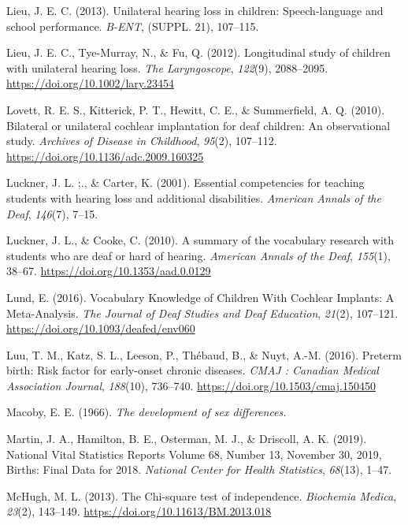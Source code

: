 \documentclass[english,man]{apa6}
\begin{document}
\leavevmode\hypertarget{ref-lieu2013}{}%
Lieu, J. E. C. (2013). Unilateral hearing loss in children: Speech-language and school performance. \emph{B-ENT}, (SUPPL. 21), 107--115.

\leavevmode\hypertarget{ref-lieu2012}{}%
Lieu, J. E. C., Tye-Murray, N., \& Fu, Q. (2012). Longitudinal study of children with unilateral hearing loss. \emph{The Laryngoscope}, \emph{122}(9), 2088--2095. \url{https://doi.org/10.1002/lary.23454}

\leavevmode\hypertarget{ref-lovett2010}{}%
Lovett, R. E. S., Kitterick, P. T., Hewitt, C. E., \& Summerfield, A. Q. (2010). Bilateral or unilateral cochlear implantation for deaf children: An observational study. \emph{Archives of Disease in Childhood}, \emph{95}(2), 107--112. \url{https://doi.org/10.1136/adc.2009.160325}

\leavevmode\hypertarget{ref-luckner2001}{}%
Luckner, J. L. ;., \& Carter, K. (2001). Essential competencies for teaching students with hearing loss and additional disabilities. \emph{American Annals of the Deaf}, \emph{146}(7), 7--15.

\leavevmode\hypertarget{ref-luckner2010}{}%
Luckner, J. L., \& Cooke, C. (2010). A summary of the vocabulary research with students who are deaf or hard of hearing. \emph{American Annals of the Deaf}, \emph{155}(1), 38--67. \url{https://doi.org/10.1353/aad.0.0129}

\leavevmode\hypertarget{ref-lund2016}{}%
Lund, E. (2016). Vocabulary Knowledge of Children With Cochlear Implants: A Meta-Analysis. \emph{The Journal of Deaf Studies and Deaf Education}, \emph{21}(2), 107--121. \url{https://doi.org/10.1093/deafed/env060}

\leavevmode\hypertarget{ref-luu2016}{}%
Luu, T. M., Katz, S. L., Leeson, P., Thébaud, B., \& Nuyt, A.-M. (2016). Preterm birth: Risk factor for early-onset chronic diseases. \emph{CMAJ : Canadian Medical Association Journal}, \emph{188}(10), 736--740. \url{https://doi.org/10.1503/cmaj.150450}

\leavevmode\hypertarget{ref-macoby1966}{}%
Macoby, E. E. (1966). \emph{The development of sex differences.}

\leavevmode\hypertarget{ref-martin2019}{}%
Martin, J. A., Hamilton, B. E., Osterman, M. J., \& Driscoll, A. K. (2019). National Vital Statistics Reports Volume 68, Number 13, November 30, 2019, Births: Final Data for 2018. \emph{National Center for Health Statistics}, \emph{68}(13), 1--47.

\leavevmode\hypertarget{ref-mchugh2013}{}%
McHugh, M. L. (2013). The Chi-square test of independence. \emph{Biochemia Medica}, \emph{23}(2), 143--149. \url{https://doi.org/10.11613/BM.2013.018}
\end{document}
